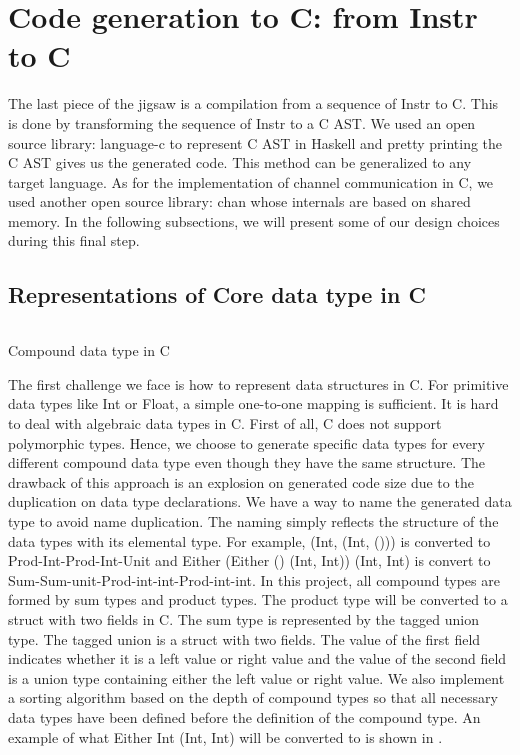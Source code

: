 \section{Code generation to C: from Instr to C}
The last piece of the jigsaw is a compilation from a sequence of Instr to C. This is done by transforming the sequence of Instr to a C AST. We used an open source library: language-c \cite{Language} to represent C AST in Haskell and pretty printing the C AST gives us the generated code. This method can be generalized to any target language. As for the implementation of channel communication in C, we used another open source library: chan \cite{treatPureImplementationGo2019a} whose internals are based on shared memory. In the following subsections, we will present some of our design choices during this final step.
\subsection{Representations of Core data type in C}
\begin{listing}[ht]
    \inputminted{C}{codegen/data.c} 
    \caption{Compound data type in C}
    \label{codegen:code:data}
\end{listing}
The first challenge we face is how to represent data structures in C. For primitive data types like Int or Float, a simple one-to-one mapping is sufficient. It is hard to deal with algebraic data types in C. First of all, C does not support polymorphic types. Hence, we choose to generate specific data types for every different compound data type even though they have the same structure. The drawback of this approach is an explosion on generated code size due to the duplication on data type declarations. We have a way to name the generated data type to avoid name duplication. The naming simply reflects the structure of the data types with its elemental type. For example, (Int, (Int, ())) is converted to Prod-Int-Prod-Int-Unit and Either (Either () (Int, Int)) (Int, Int) is convert to Sum-Sum-unit-Prod-int-int-Prod-int-int. In this project, all compound types are formed by sum types and product types. The product type will be converted to a struct with two fields in C. The sum type is represented by the tagged union type. The tagged union is a struct with two fields. The value of the first field indicates whether it is a left value or right value and the value of the second field is a union type containing either the left value or right value. We also implement a sorting algorithm based on the depth of compound types so that all necessary data types have been defined before the definition of the compound type. An example of what Either Int (Int, Int) will be converted to is shown in .

